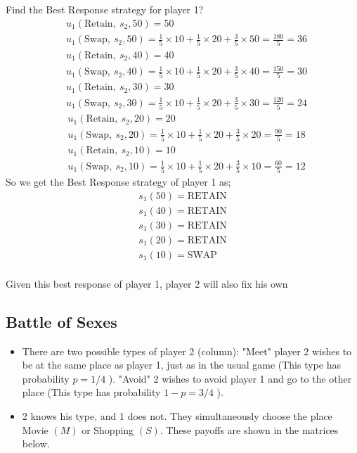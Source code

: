 \documentclass[12pt,a4paper,fleqn]{article}
\begin{document}
Find the Best Response strategy for player 1?
 \begin{align*}
    &u_{1}(\text{Retain}, \ s_{2}, 50) = 50\\
    &u_{1}(\text{Swap}, \ s_{2}, 50) = \frac{1}{5} \times 10 + \frac{1}{5} \times 20 + \frac{3}{5} \times 50 = \frac{180}{5} = 36
\end{align*}
\begin{align*}
    &u_{1}(\text{Retain}, \ s_{2}, 40) = 40\\
    &u_{1}(\text{Swap}, \ s_{2}, 40) = \frac{1}{5} \times 10 + \frac{1}{5} \times 20 + \frac{3}{5} \times 40 = \frac{150}{5} = 30
\end{align*}
\begin{align*}
    &u_{1}(\text{Retain}, \ s_{2}, 30) = 30\\
    &u_{1}(\text{Swap}, \ s_{2}, 30) = \frac{1}{5} \times 10 + \frac{1}{5} \times 20 + \frac{3}{5} \times 30 = \frac{120}{5} = 24
\end{align*}
\begin{align*}
    &u_{1}(\text{Retain}, \ s_{2}, 20) = 20\\
    &u_{1}(\text{Swap}, \ s_{2}, 20) = \frac{1}{5} \times 10 + \frac{1}{5} \times 20 + \frac{3}{5} \times 20 = \frac{90}{5} = 18
\end{align*}
\begin{align*}
    &u_{1}(\text{Retain}, \ s_{2}, 10) = 10\\
    &u_{1}(\text{Swap}, \ s_{2}, 10) = \frac{1}{5} \times 10 + \frac{1}{5} \times 20 + \frac{3}{5} \times 10 = \frac{60}{5} = 12
\end{align*}
So we get the Best Response strategy of player 1 as;
 \begin{align*}
    s_{1}(50)=\text{RETAIN}\\
    s_{1}(40)=\text{RETAIN}\\
    s_{1}(30)=\text{RETAIN}\\
    s_{1}(20)=\text{RETAIN}\\
    s_{1}(10)=\text{SWAP}\\
\end{align*}

Given this best response of player 1, player 2 will also fix his own

\subsection{Battle of Sexes}
\begin{itemize}

\item There are two possible types of player 2 (column): "Meet" player 2 wishes to be at the same place as player 1, just as in the usual game (This type has probability \(p=1 / 4\) ). "Avoid" 2 wishes to avoid player 1 and go to the other place (This type has probability \(1-p=3 / 4\) ).
\item 2 knows his type, and 1 does not. They simultaneously choose the place Movie \((M)\) or Shopping \((S)\). These payoffs are shown in the matrices below.
\end{itemize}
\end{document}
